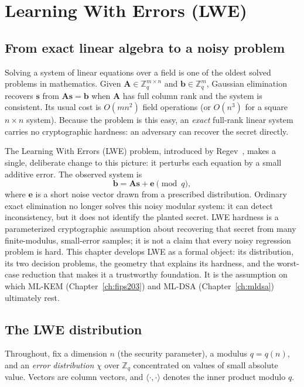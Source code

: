 \chapter{Learning With Errors (LWE)}
\label{ch:lwe}

\section{From exact linear algebra to a noisy problem}

Solving a system of linear equations over a field is one of the oldest solved problems in mathematics. Given $\mathbf{A}\in\mathbb{Z}_q^{m\times n}$ and $\mathbf{b}\in\mathbb{Z}_q^{m}$, Gaussian elimination recovers $\mathbf{s}$ from $\mathbf{A}\mathbf{s}=\mathbf{b}$ when $\mathbf{A}$ has full column rank and the system is consistent. Its usual cost is $O(mn^2)$ field operations (or $O(n^3)$ for a square $n\times n$ system). Because the problem is this easy, an \emph{exact} full-rank linear system carries no cryptographic hardness: an adversary can recover the secret directly.

The Learning With Errors (LWE) problem, introduced by Regev~\cite{regev2009}, makes a single, deliberate change to this picture: it perturbs each equation by a small additive error. The observed system is
\[
\mathbf{b} = \mathbf{A}\mathbf{s} + \mathbf{e} \pmod q,
\]
where $\mathbf{e}$ is a short noise vector drawn from a prescribed distribution. Ordinary exact elimination no longer solves this noisy modular system: it can detect inconsistency, but it does not identify the planted secret. LWE hardness is a parameterized cryptographic assumption about recovering that secret from many finite-modulus, small-error samples; it is not a claim that every noisy regression problem is hard. This chapter develops LWE as a formal object: its distribution, its two decision problems, the geometry that explains its hardness, and the worst-case reduction that makes it a trustworthy foundation. It is the assumption on which ML-KEM (Chapter~\ref{ch:fips203}) and ML-DSA (Chapter~\ref{ch:mldsa}) ultimately rest.

\section{The LWE distribution}

Throughout, fix a dimension $n$ (the security parameter), a modulus $q=q(n)$, and an \emph{error distribution} $\chi$ over $\mathbb{Z}_q$ concentrated on values of small absolute value. Vectors are column vectors, and $\langle\cdot,\cdot\rangle$ denotes the inner product modulo $q$.

